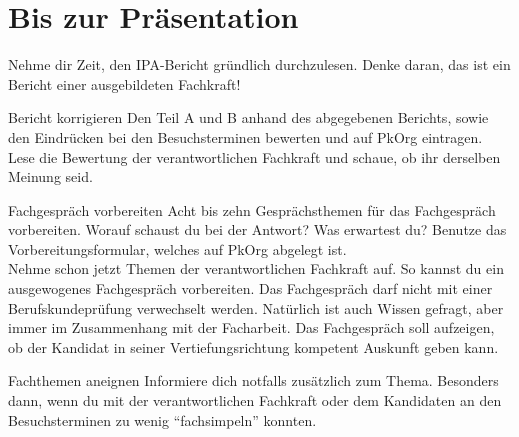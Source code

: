 \section{Bis zur Präsentation}
Nehme dir Zeit, den IPA-Bericht gründlich durchzulesen. Denke daran, das ist ein Bericht einer ausgebildeten Fachkraft!

\begin{taskitemwithoutcomment}{Bericht korrigieren}
  Den Teil A und B anhand des abgegebenen Berichts, sowie den Eindrücken bei den Besuchsterminen bewerten und auf PkOrg eintragen. Lese die Bewertung der verantwortlichen Fachkraft und schaue, ob ihr derselben Meinung seid.
\end{taskitemwithoutcomment}
\begin{taskitemwithoutcomment}{Fachgespräch vorbereiten}
  Acht bis zehn Gesprächsthemen für das Fachgespräch vorbereiten. Worauf schaust du bei der Antwort? Was erwartest du? Benutze das Vorbereitungsformular, welches auf PkOrg abgelegt ist.\\ Nehme schon jetzt Themen der verantwortlichen Fachkraft auf. So kannst du ein ausgewogenes Fachgespräch vorbereiten. Das Fachgespräch darf nicht mit einer Berufskundeprüfung verwechselt werden. Natürlich ist auch Wissen gefragt, aber immer im Zusammenhang mit der Facharbeit. Das Fachgespräch soll aufzeigen, ob der Kandidat in seiner Vertiefungsrichtung kompetent Auskunft geben kann.
\end{taskitemwithoutcomment}
\begin{taskitem}{Fachthemen aneignen}
  Informiere dich notfalls zusätzlich zum Thema. Besonders dann, wenn du mit der verantwortlichen Fachkraft oder dem Kandidaten an den Besuchsterminen zu wenig \enquote{fachsimpeln} konnten.
\end{taskitem}
